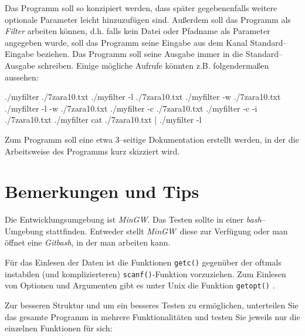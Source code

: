 \documentclass[a4paper,notitlepage,parskip=half,plainheadsepline]{scrartcl}
\newcommand{\mingw}{\textsl{MinGW}}
\newcommand{\bash}{\emph{bash}}
\newcommand{\git}{\emph{Git}}
\begin{document}
Das Programm soll so konzipiert werden, dass später gegebenenfalls weitere optionale Parameter leicht hinzuzufügen sind.
Außerdem soll das Programm als \emph{Filter} arbeiten können, d.h. falls kein Datei oder Pfadname als Parameter angegeben wurde, soll das Programm seine Eingabe aus dem Kanal Standard--Eingabe beziehen. Das Programm soll seine Ausgabe immer in die Standard--Ausgabe schreiben.
Einige mögliche Aufrufe könnten z.B. folgendermaßen aussehen:

\begin{commandshell}
./myfilter       ./7zara10.txt                     
./myfilter -l    ./7zara10.txt         
./myfilter -w    ./7zara10.txt         
./myfilter -l -w ./7zara10.txt        
./myfilter -c    ./7zara10.txt             
./myfilter -c -i ./7zara10.txt         
./myfilter                             
cat ./7zara10.txt | ./myfilter -l        
\end{commandshell}

Zum Programm soll eine etwa 3--seitige Dokumentation erstellt werden, in der die Arbeitsweise des Programms kurz skizziert wird.

\section{Bemerkungen und Tips}
Die Entwicklungsumgebung ist \mingw. Das Testen sollte in einer \bash--Umgebung stattfinden. Entweder stellt \mingw\ diese zur Verfügung oder man öffnet eine \git\bash, in der man arbeiten kann.

Für das Einlesen der Daten ist die Funktionen \texttt{getc()} gegenüber der oftmals instabilen (und komplizierteren) \texttt{scanf()}-Funktion vorzuziehen.
Zum Einlesen von Optionen und Argumenten gibt es unter Unix die Funktion \texttt{getopt()} . 

Zur besseren Struktur und um ein besseres Testen zu ermöglichen, unterteilen Sie das gesamte Programm in mehrere Funktionalitäten und testen Sie jeweils nur die einzelnen Funktionen für sich:
\end{document}
